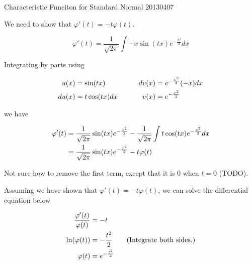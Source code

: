 \documentclass{article}
\begin{document}
\begin{section}{Characteristic Funciton for Standard Normal 20130407}
\begin{enumerate}
We need to show that $\varphi'(t) = -t \varphi(t)$.

\[\varphi'(t) = \frac{1}{\sqrt{2\pi}} \int -x \sin(tx) e^{-\frac{x^2}{2}} dx \]

Integrating by parts using

\begin{align}
u(x) &= \sin(tx) & \qquad dv(x) &= e^{-\frac{x^2}{2}} (-x) dx \notag\\
du(x) &= t \cos(tx) dx & \qquad v(x) &= e^{-\frac{x^2}{2}} \notag
\end{align}

we have

\begin{align}
\varphi'(t) &= \frac{1}{\sqrt{2\pi}} \sin(tx) e^{-\frac{x^2}{2}} -
    \frac{1}{\sqrt{2\pi}} \int t \cos(tx) e^{-\frac{x^2}{2}} dx \notag\\
            &= \frac{1}{\sqrt{2\pi}} \sin(tx) e^{-\frac{x^2}{2}} -
               t \varphi(t) \notag
\end{align}

Not sure how to remove the first term, except that it is 0 when $t=0$ (TODO).

Assuming we have shown that $\varphi'(t) = -t \varphi(t)$, we can solve
the differential equation below

\begin{align}
\frac{\varphi'(t)}{\varphi(t)} &= -t \notag\\
\ln(\varphi(t)) &= -\frac{t^2}{2}  \qquad\text{(Integrate both sides.)}\notag\\
\varphi(t) &= e^{-\frac{t^2}{2}} \notag%
\end{align}




\end{enumerate}
\end{section}
\end{document}
